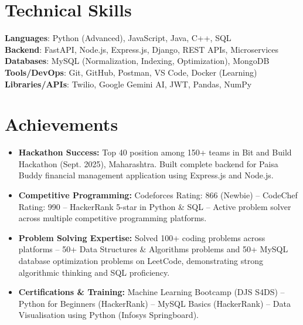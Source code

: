 \documentclass[letterpaper,11pt]{article}
\newcommand{\resumeItem}[1]{
  \item\small{
    {#1 \vspace{-2pt}}
  }
}
\newcommand{\resumeSubHeadingListStart}{\begin{itemize}[leftmargin=0.15in, label={}]}
\newcommand{\resumeSubHeadingListEnd}{\end{itemize}}
\begin{document}
\section{Technical Skills}
 \begin{itemize}[leftmargin=0.15in, label={}]
    \small{\item{
     \textbf{Languages}{: Python (Advanced), JavaScript, Java, C++, SQL} \\
     \textbf{Backend}{: FastAPI, Node.js, Express.js, Django, REST APIs, Microservices} \\
     \textbf{Databases}{: MySQL (Normalization, Indexing, Optimization), MongoDB} \\
     \textbf{Tools/DevOps}{: Git, GitHub, Postman, VS Code, Docker (Learning)} \\
     \textbf{Libraries/APIs}{: Twilio, Google Gemini AI, JWT, Pandas, NumPy}
    }}
 \end{itemize}

\section{Achievements}
 \resumeSubHeadingListStart
    \resumeItem{\textbf{Hackathon Success:} Top 40 position among 150+ teams in Bit and Build Hackathon (Sept. 2025), Maharashtra. Built complete backend for Paisa Buddy financial management application using Express.js and Node.js.}
    
    \resumeItem{\textbf{Competitive Programming:} Codeforces Rating: 866 (Newbie) -- CodeChef Rating: 990 -- HackerRank 5-star in Python \& SQL -- Active problem solver across multiple competitive programming platforms.}
    
    \resumeItem{\textbf{Problem Solving Expertise:} Solved 100+ coding problems across platforms -- 50+ Data Structures \& Algorithms problems and 50+ MySQL database optimization problems on LeetCode, demonstrating strong algorithmic thinking and SQL proficiency.}
    
    \resumeItem{\textbf{Certifications \& Training:} Machine Learning Bootcamp (DJS S4DS) -- Python for Beginners (HackerRank) -- MySQL Basics (HackerRank) -- Data Visualisation using Python (Infosys Springboard).}
 \resumeSubHeadingListEnd

\end{document}
